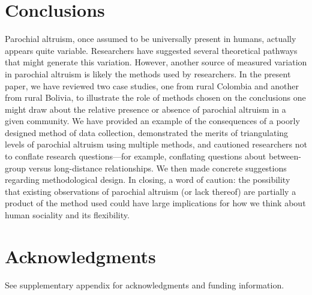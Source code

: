 \documentclass[bibauthoryear]{aa}
\begin{document}
\section{Conclusions}

Parochial altruism, once assumed to be universally present in humans, actually appears quite variable. Researchers have suggested several theoretical pathways that might generate this variation. %
However, another source of measured variation in  parochial altruism is likely the methods used by researchers. In the present paper, we have reviewed two case studies, one from rural Colombia and another from rural Bolivia, to illustrate the role of methods chosen on the conclusions one might draw about the relative presence or absence of parochial altruism in a given community. We have provided an example of the consequences of a poorly designed method of data collection, demonstrated the merits of triangulating levels of parochial altruism using multiple methods, and cautioned researchers not to conflate research questions---for example, conflating questions about between-group versus long-distance relationships. We then made concrete suggestions regarding methodological design. In closing, a word of caution: the possibility that existing observations of parochial altruism (or lack thereof) are partially a product of the method used could have large implications for how we think about human sociality and its flexibility.

\section*{Acknowledgments}
See supplementary appendix for acknowledgments and funding information.




\end{document}
